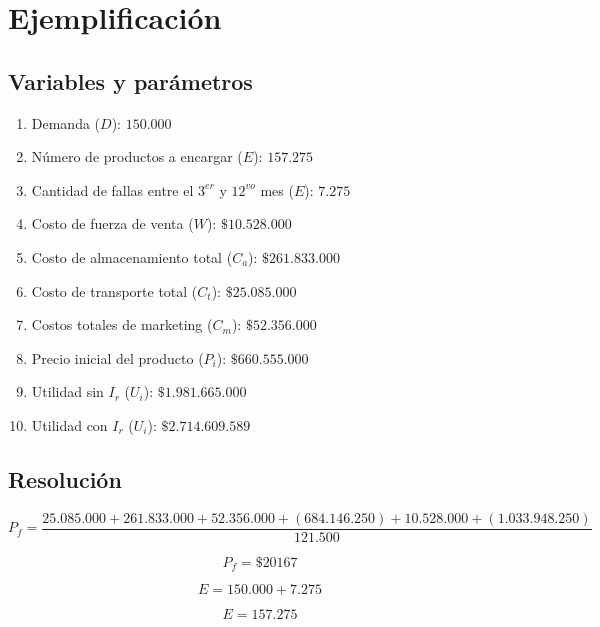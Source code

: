 \documentclass[12pt]{report}
\begin{document}

\section*{Ejemplificaci\'on}

\subsection*{Variables y par\'ametros}

\begin{enumerate}
    \item Demanda ($D$): $150.000$
    \item N\'umero de productos a encargar ($E$): $157.275$
    \item Cantidad de fallas entre el $3^{er}$ y $12^{vo}$ mes ($E$): $7.275$
    \item Costo de fuerza de venta ($W$): $\$10.528.000$
    \item Costo de almacenamiento total ($C_{a}$): $\$261.833.000$
    \item Costo de transporte total ($C_{t}$): $\$25.085.000$
    \item Costos totales de marketing ($C_{m}$): $\$52.356.000$
    \item Precio inicial del producto ($P_{i}$): $\$660.555.000$
    \item Utilidad sin $I_{r}$ ($U_{i}$): $\$1.981.665.000$
    \item Utilidad con $I_{r}$ ($U_{i}$): $\$2.714.609.589$
\end{enumerate}

\subsection*{Resoluci\'on}
$$P_{f} = \frac{25.085.000+261.833.000+52.356.000+(684.146.250)+10.528.000+(1.033.948.250)}{121.500}$$

$$P_{f} = \$20167$$

$$E = 150.000 + 7.275$$

$$E = 157.275$$



\end{document}

